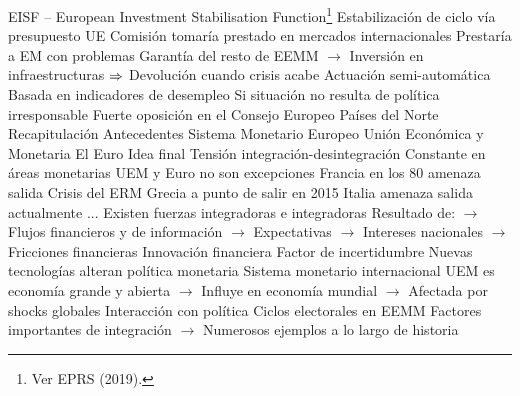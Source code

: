 \documentclass{nuevotema}
\begin{document}
\begin{esquemal}
			\3 EISF -- European Investment Stabilisation Function\footnote{Ver EPRS (2019).}
				\4 Estabilización de ciclo vía presupuesto UE
				\4 Comisión tomaría prestado en mercados internacionales
				\4[] Prestaría a EM con problemas
				\4[] Garantía del resto de EEMM
				\4[] $\to$ Inversión en infraestructuras
				\4[] $\Rightarrow$ Devolución cuando crisis acabe
				\4 Actuación semi-automática
				\4[] Basada en indicadores de desempleo
				\4[] Si situación no resulta de política irresponsable
				\4 Fuerte oposición en el Consejo Europeo
				\4[] Países del Norte
	\1[] 
		\2 Recapitulación
			\3 Antecedentes
			\3 Sistema Monetario Europeo
			\3 Unión Económica y Monetaria
			\3 El Euro
		\2 Idea final
			\3 Tensión integración-desintegración
				\4 Constante en áreas monetarias
				\4 UEM y Euro no son excepciones
				\4[] Francia en los 80 amenaza salida
				\4[] Crisis del ERM
				\4[] Grecia a punto de salir en 2015
				\4[] Italia amenaza salida actualmente
				\4[] ...
				\4 Existen fuerzas integradoras e integradoras
				\4[] Resultado de:
				\4[] $\to$ Flujos financieros y de información
				\4[] $\to$ Expectativas
				\4[] $\to$ Intereses nacionales
				\4[] $\to$ Fricciones financieras
			\3 Innovación financiera
				\4 Factor de incertidumbre
				\4 Nuevas tecnologías alteran política monetaria
			\3 Sistema monetario internacional
				\4 UEM es economía grande y abierta
				\4[] $\to$ Influye en economía mundial
				\4[] $\to$ Afectada por shocks globales
			\3 Interacción con política
				\4 Ciclos electorales en EEMM
				\4[] Factores importantes de integración
				\4[] $\to$ Numerosos ejemplos a lo largo de historia
\end{esquemal}


\conceptos

\end{document}
